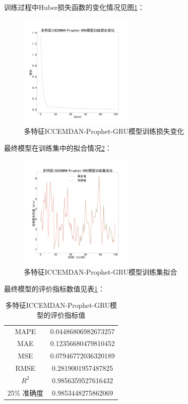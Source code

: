 \documentclass[AutoFakeBold]{LZUThesis}
\begin{document}
训练过程中Huber损失函数的变化情况见图\ref{fig_all_prophet_gru_training_loss}：

\begin{figure}[H]
	\centering
    \includegraphics[width=0.5\textwidth]{figures/all_prophet_gru_training_loss.pdf}
    \caption{多特征ICCEMDAN-Prophet-GRU模型训练损失变化}
    \label{fig_all_prophet_gru_training_loss}
\end{figure}

最终模型在训练集中的拟合情况\ref{fig_all_prophet_gru_predict_train}：

\begin{figure}[H]
	\centering
    \includegraphics[width=0.5\textwidth]{figures/all_prophet_gru_predict_train.pdf}
    \caption{多特征ICCEMDAN-Prophet-GRU模型训练集拟合}
    \label{fig_all_prophet_gru_predict_train}
\end{figure}

最终模型的评价指标数值见表\ref{all_prophet_gru_result}：

\begin{table}[H]
    \centering
    \caption{多特征ICCEMDAN-Prophet-GRU模型的评价指标值}
    \begin{tabular}{cc}
    \toprule
    MAPE & 0.04486806982673257 \\
    MAE & 0.12356680479810452 \\
    MSE & 0.07946772036320189 \\
    RMSE & 0.2819001957487825 \\
    $R^2$ & 0.9856359527616432 \\
    25\% 准确度 & 0.9853448275862069 \\
    \bottomrule
    \end{tabular}
    \label{all_prophet_gru_result}
\end{table}
\end{document}
